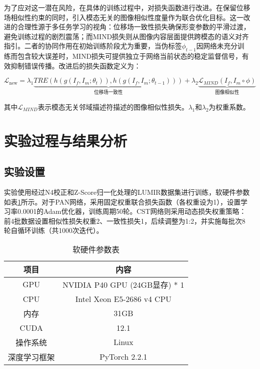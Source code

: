 为了应对这一潜在风险，在具体的训练过程中，对损失函数进行改进。在保留位移场相似性约束的同时，引入模态无关的图像相似性度量作为联合优化目标。这一改进的合理性源于多任务学习的视角：位移场一致性损失确保形变参数的平滑过渡，避免训练过程的剧烈震荡；而MIND损失则从图像内容层面提供跨模态的语义对齐指引。二者的协同作用在初始训练阶段尤为重要，当伪标签$\phi_{t-1}$因网络未充分训练而包含较大误差时，MIND损失可提供独立于网络当前状态的稳定监督信号，有效抑制错误传播。改进后的损失函数定义为：

\begin{equation}
    \mathcal{L}_{\text{new}} = \lambda_1 \underbrace{TRE(h(g(I_f,I_m;\theta_t)),h(g(I_f,I_m;\theta_{t-1})))}_{\text{位移场一致性}} + \lambda_2 \underbrace{\mathcal{L}_{MIND}(I_f,I_m\circ \phi)}_{\text{图像相似性}}
\end{equation}

其中$\mathcal{L}_{MIND}$表示模态无关邻域描述符描述的图像相似性损失。$\lambda_1$和$\lambda_2$为权重系数。

\section{实验过程与结果分析}

\subsection{实验设置}
实验使用经过N4校正和Z-Score归一化处理的LUMIR数据集进行训练，软硬件参数如表\ref{tab:environment}所示。对于PAN网络，采用固定权重联合损失函数（各权重设为1），设置学习率0.0001的Adam优化器，训练周期50轮。CST网络则采用动态损失权重策略：前4批数据设置相似性损失权重2、一致性损失1，后续调整为1:2，并实施每批次8轮自循环训练（共1000次迭代）。

\begin{table}[ht]
    \centering
    \caption{软硬件参数表}
    \begin{tabular}{c c}
        \toprule
        \textbf{项目} & \textbf{内容}                 \\
        \midrule
        GPU         & NVIDIA P40 GPU (24GB显存) * 1 \\
        CPU         & Intel Xeon E5-2686 v4 CPU   \\
        内存          & 31GB                        \\
        CUDA        & 12.1                        \\
        操作系统        & Linux                       \\
        深度学习框架      & PyTorch 2.2.1               \\
        \bottomrule
    \end{tabular}
    \label{tab:environment}
\end{table}

